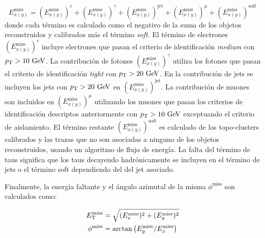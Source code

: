 \begin{equation}
  E^{\mathrm{miss}}_{x(y)} = (E^{\mathrm{miss}}_{x(y)})^e + (E^{\mathrm{miss}}_{x(y)})^\gamma + (E^{\mathrm{miss}}_{x(y)})^{\text{jet}} + (E^{\mathrm{miss}}_{x(y)})^{\mu} + (E^{\mathrm{miss}}_{x(y)})^{\mathrm{soft}}
\end{equation}
%
donde cada término es calculado como el negativo de la suma de los objetos reconstruidos y
calibrados más el término \emph{soft}.
El término de electrones $(E^{\mathrm{miss}}_{x(y)})^e$ incluye electrones que
pasan el criterio de identificación \emph{medium} con $\pt>10\gev$. La
contribución de fotones $(E^{\mathrm{miss}}_{x(y)})^{\gamma}$ utiliza los
fotones que pasan el criterio de identificación \emph{tight} con $\pt>20\gev$.
En la contribución de jets se incluyen los jets con $\pt>20\gev$ en
$(E^{\mathrm{miss}}_{x(y)})^{\text{jet}}$. La contribución de muones son
incluidos en $(E^{\mathrm{miss}}_{x(y)})^{\mu}$ utilizando los muones que pasan
los criterios de identificación descriptos anteriormente con $\pt>10\gev$
exceptuando el criterio de aislamiento. El término restante
$(E^{\mathrm{miss}}_{x(y)})^{\mathrm{soft}}$ es calculado de los topo-clusters
calibrados y las trazas que no son asociadas a ninguno de los objetos
reconstruidos, usando un algoritmo de flujo de energía.
La falta del término de taus significa que los taus decayendo hadrónicamente se
incluyen en el término de jets o el término soft dependiendo del {\pt} del jet
asociado.

Finalmente, la energia faltante {\met} y el ángulo azimutal de la misma
$\phi^\mathrm{miss}$ son calculados como:

\begin{align}
  E_{\mathrm{T}}^{\mathrm{miss}} &= \sqrt{ (E^{\mathrm{miss}}_x)^2 + (E^{\mathrm{miss}}_y)^2 } \\
  \phi^{\mathrm{miss}} &= \arctan \left( E^{\mathrm{miss}}_y / E^{\mathrm{miss}}_x \right)
\end{align}
